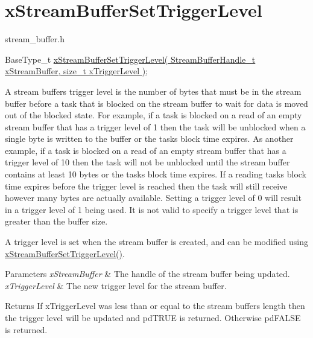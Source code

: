 \hypertarget{group__xStreamBufferSetTriggerLevel}{}\section{x\+Stream\+Buffer\+Set\+Trigger\+Level}
\label{group__xStreamBufferSetTriggerLevel}
stream\+\_\+buffer.\+h


\begin{DoxyPre}
BaseType\_t \hyperlink{stream__buffer_8h_a28f0280587c76e71efeaa8f415ebde04}{xStreamBufferSetTriggerLevel( StreamBufferHandle\_t xStreamBuffer, size\_t xTriggerLevel )};
\end{DoxyPre}


A stream buffer\textquotesingle{}s trigger level is the number of bytes that must be in the stream buffer before a task that is blocked on the stream buffer to wait for data is moved out of the blocked state. For example, if a task is blocked on a read of an empty stream buffer that has a trigger level of 1 then the task will be unblocked when a single byte is written to the buffer or the task\textquotesingle{}s block time expires. As another example, if a task is blocked on a read of an empty stream buffer that has a trigger level of 10 then the task will not be unblocked until the stream buffer contains at least 10 bytes or the task\textquotesingle{}s block time expires. If a reading task\textquotesingle{}s block time expires before the trigger level is reached then the task will still receive however many bytes are actually available. Setting a trigger level of 0 will result in a trigger level of 1 being used. It is not valid to specify a trigger level that is greater than the buffer size.

A trigger level is set when the stream buffer is created, and can be modified using \hyperlink{stream__buffer_8h_a28f0280587c76e71efeaa8f415ebde04}{x\+Stream\+Buffer\+Set\+Trigger\+Level()}.


\begin{DoxyParams}{Parameters}
{\em x\+Stream\+Buffer} & The handle of the stream buffer being updated.\\
\hline
{\em x\+Trigger\+Level} & The new trigger level for the stream buffer.\\
\hline
\end{DoxyParams}
\begin{DoxyReturn}{Returns}
If x\+Trigger\+Level was less than or equal to the stream buffer\textquotesingle{}s length then the trigger level will be updated and pd\+T\+R\+UE is returned. Otherwise pd\+F\+A\+L\+SE is returned. 
\end{DoxyReturn}
